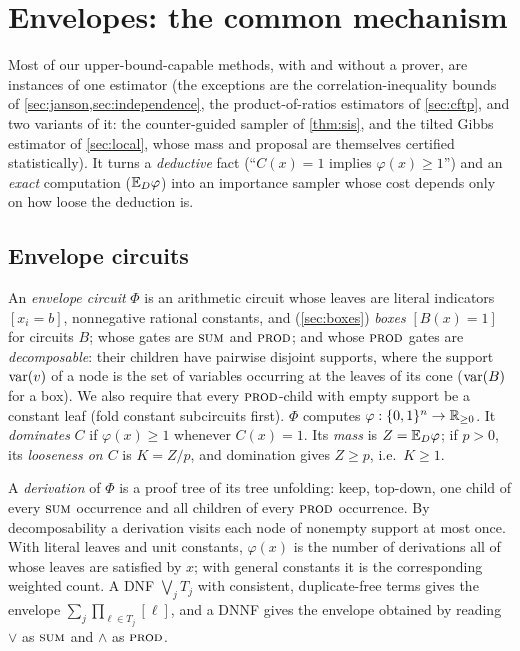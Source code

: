 \section{Envelopes: the common mechanism}\label{sec:envelopes}

Most of our upper-bound-capable methods, with and without a prover, are
instances of one estimator (the exceptions are the correlation-inequality bounds
of \cref{sec:janson,sec:independence}, the product-of-ratios estimators of
\cref{sec:cftp}, and two variants of it: the counter-guided sampler of
\cref{thm:sis}, and the tilted Gibbs estimator of \cref{sec:local}, whose mass and
proposal are themselves certified statistically). It turns a \emph{deductive}
fact (``$C(x)=1$ implies $\varphi(x)\ge1$'') and an \emph{exact} computation
($\mathbb{E}_D\varphi$) into an importance sampler whose cost depends only on how loose
the deduction is.

\subsection{Envelope circuits}

\begin{definition}[envelope]\label{def:envelope}
An \emph{envelope circuit} $\Phi$ is an arithmetic circuit whose leaves are
literal indicators $[x_i=b]$, nonnegative rational constants, and
(\cref{sec:boxes}) \emph{boxes} $[B(x)=1]$ for circuits $B$; whose gates are
$\textsc{sum}$ and $\textsc{prod}$; and whose $\textsc{prod}$ gates are \emph{decomposable}: their children
have pairwise disjoint supports, where the support $\mathrm{var}(v)$ of a node is the set of
variables occurring at the leaves of its cone ($\mathrm{var}(B)$ for a box). We also require
that every $\textsc{prod}$-child with empty support be a constant leaf (fold constant
subcircuits first). $\Phi$ computes $\varphi:\{0,1\}^n\to\mathbb{R}_{\ge0}$. It
\emph{dominates} $C$ if $\varphi(x)\ge1$ whenever $C(x)=1$. Its \emph{mass} is
$Z=\mathbb{E}_D\varphi$; if $p>0$, its \emph{looseness on $C$} is $K=Z/p$, and domination
gives $Z\ge p$, i.e.\ $K\ge1$.
\end{definition}

A \emph{derivation} of $\Phi$ is a proof tree of its tree unfolding: keep,
top-down, one child of every $\textsc{sum}$ occurrence and all children of every $\textsc{prod}$
occurrence. By decomposability a derivation visits each node of nonempty support
at most once. With literal leaves and unit constants, $\varphi(x)$ is the number of
derivations all of whose leaves are satisfied by $x$; with general constants it is
the corresponding weighted count. A DNF $\bigvee_j T_j$ with consistent,
duplicate-free terms gives the envelope $\sum_j\prod_{\ell\in T_j}[\ell]$, and a DNNF
gives the envelope obtained by reading $\vee$ as $\textsc{sum}$ and $\wedge$ as $\textsc{prod}$.

